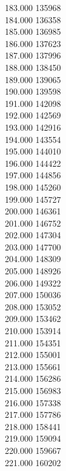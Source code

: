 { 183.000	135968 \\
 184.000	136358 \\
 185.000	136985 \\
 186.000	137623 \\
 187.000	137996 \\
 188.000	138450 \\
 189.000	139065 \\
 190.000	139598 \\
 191.000	142098 \\
 192.000	142569 \\
 193.000	142916 \\
 194.000	143554 \\
 195.000	144010 \\
 196.000	144422 \\
 197.000	144856 \\
 198.000	145260 \\
 199.000	145727 \\
 200.000	146361 \\
 201.000	146752 \\
 202.000	147304 \\
 203.000	147700 \\
 204.000	148309 \\
 205.000	148926 \\
 206.000	149322 \\
 207.000	150036 \\
 208.000	153052 \\
 209.000	153462 \\
 210.000	153914 \\
 211.000	154351 \\
 212.000	155001 \\
 213.000	155661 \\
 214.000	156286 \\
 215.000	156983 \\
 216.000	157338 \\
 217.000	157786 \\
 218.000	158441 \\
 219.000	159094 \\
 220.000	159667 \\
 221.000	160202 \\
}
